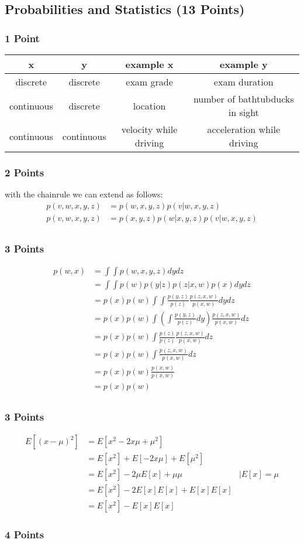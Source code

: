 \newif\ifvimbug
\vimbugfalse

\ifvimbug

\fi


\subsection{Probabilities and Statistics (13 Points)}
\subsubsection{1 Point}
\begin{tabular}{|c|c||c|c|}
x & y  & example x & example y \\\hline
discrete & discrete & exam grade & exam duration \\
continuous & discrete & location & number of bathtubducks in sight\\
continuous & continuous & velocity while driving & acceleration while driving\\
\end{tabular}
\subsubsection{2 Points}
 with the chainrule we can extend  as follows:
 \begin{align*}
p(v,w,x,y,z) &= p(w,x,y,z)p(v|w,x,y,z)\\
p(v,w,x,y,z) &= p(x,y,z)p(w|x,y,z)p(v|w,x,y,z)\\
\end{align*}
\subsubsection{3 Points}
 \begin{align*}
p(w,x) &= \int \int p(w,x,y,z) dy dz \\
&= \int \int p(w) p(y|z) p(z|x,w) p(x) dy dz\\
&= p(x) p(w) \int \int \frac{p(y,z)}{p(z)} \frac{p(z,x,w)}{p(x,w)} dy dz\\
&= p(x) p(w) \int (\int \frac{p(y,z)}{p(z)}dy) \frac{p(z,x,w)}{p(x,w)}  dz\\
&= p(x) p(w) \int \frac{p(z)}{p(z)} \frac{p(z,x,w)}{p(x,w)}  dz\\
&= p(x) p(w) \int \frac{p(z,x,w)}{p(x,w)}  dz\\
&= p(x) p(w) \frac{p(x,w)}{p(x,w)}\\
&= p(x) p(w) \\
\end{align*}
\subsubsection{3 Points}
\begin{align*}
E[(x-\mu)^2] &= E[x^2-2 x \mu + \mu^2]\\
&= E[x^2] + E[-2 x \mu] + E[\mu^2]\\
&=  E[x^2] -2 \mu E[x] +  \mu \mu & | E[x]=\mu\\
&=  E[x^2] -2 E[x] E[x] +  E[x] E[x] \\
&=  E[x^2] -  E[x] E[x] 
\end{align*}
\subsubsection{4 Points}